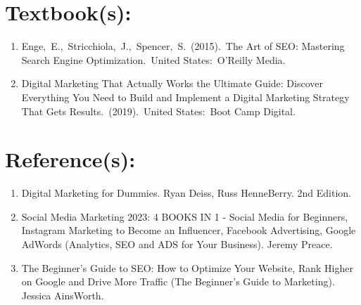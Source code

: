 \section{Textbook(s):}
\begin{enumerate}
    
    \item Enge, E., Stricchiola, J., Spencer, S. (2015). The Art of SEO: Mastering Search Engine Optimization. United States: O'Reilly Media.
    \item Digital Marketing That Actually Works the Ultimate Guide: Discover Everything You Need to Build and Implement a Digital Marketing Strategy That Gets Results. (2019). United States: Boot Camp Digital.
    
\end{enumerate}


\section{Reference(s):}
\begin{enumerate}
    \item Digital Marketing for Dummies. Ryan Deiss, Russ HenneBerry. 2nd Edition.
    \item Social Media Marketing 2023: 4 BOOKS IN 1 - Social Media for Beginners, Instagram Marketing to Become an Influencer, Facebook Advertising, Google AdWords (Analytics, SEO and ADS for Your Business). Jeremy Preace. 
    \item  The Beginner's Guide to SEO: How to Optimize Your Website, Rank Higher on Google and Drive More Traffic (The Beginner's Guide to Marketing). Jessica AinsWorth.
\end{enumerate}